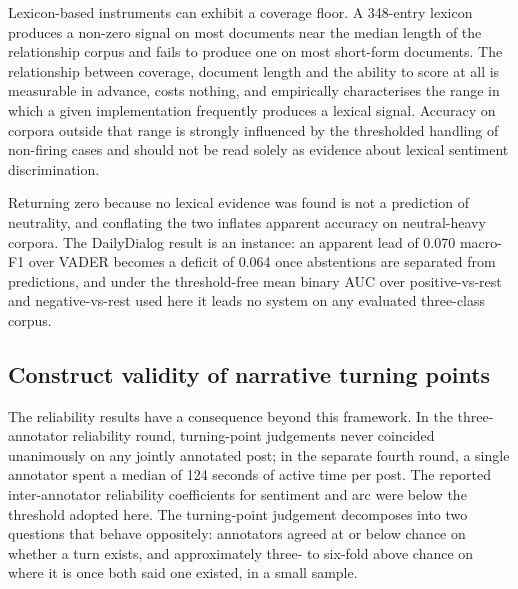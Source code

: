 \documentclass[fleqn,10pt]{wlscirep}
\begin{document}
Lexicon-based instruments can exhibit a coverage floor. A 348-entry lexicon produces a non-zero signal on most documents near the median length of the relationship corpus and fails to produce one on most short-form documents. The relationship between coverage, document length and the ability to score at all is measurable in advance, costs nothing, and empirically characterises the range in which a given implementation frequently produces a lexical signal. Accuracy on corpora outside that range is strongly influenced by the thresholded handling of non-firing cases and should not be read solely as evidence about lexical sentiment discrimination.

Returning zero because no lexical evidence was found is not a prediction of neutrality, and conflating the two inflates apparent accuracy on neutral-heavy corpora. The DailyDialog result is an instance: an apparent lead of 0.070 macro-F1 over VADER becomes a deficit of 0.064 once abstentions are separated from predictions, and under the threshold-free mean binary AUC over positive-vs-rest and negative-vs-rest used here it leads no system on any evaluated three-class corpus.

\subsection{Construct validity of narrative turning points}

The reliability results have a consequence beyond this framework. In the three-annotator reliability round, turning-point judgements never coincided unanimously on any jointly annotated post; in the separate fourth round, a single annotator spent a median of 124 seconds of active time per post. The reported inter-annotator reliability coefficients for sentiment and arc were below the threshold adopted here. The turning-point judgement decomposes into two questions that behave oppositely: annotators agreed at or below chance on whether a turn exists, and approximately three- to six-fold above chance on where it is once both said one existed, in a small sample.
\end{document}
